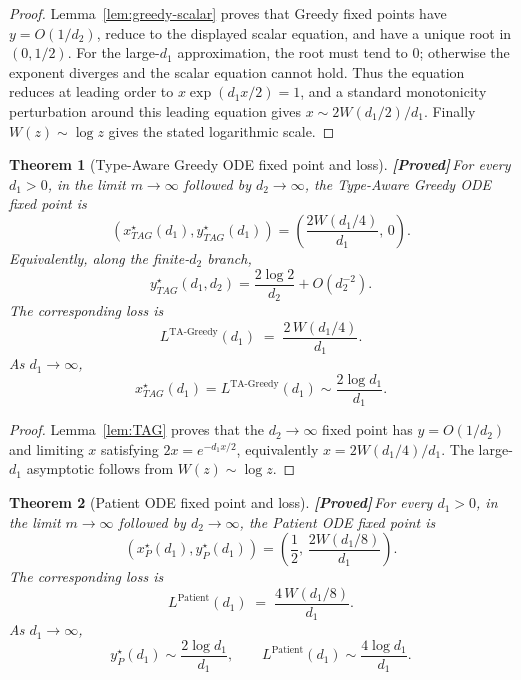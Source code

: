 \documentclass{article}
\theoremstyle{plain}
\newtheorem{theorem}{Theorem}
\theoremstyle{definition}
\newcommand{\proved}{\textcolor{provedgreen}{\textbf{[Proved]}}\,}
\begin{document}
\begin{proof}
Lemma~\ref{lem:greedy-scalar} proves that Greedy fixed points have $y=O(1/d_2)$, reduce to the displayed scalar equation, and have a unique root in $(0,1/2)$. For the large-$d_1$ approximation, the root must tend to $0$; otherwise the exponent diverges and the scalar equation cannot hold. Thus the equation reduces at leading order to $x\exp(d_1x/2)=1$, and a standard monotonicity perturbation around this leading equation gives $x\sim 2W(d_1/2)/d_1$. Finally $W(z)\sim\log z$ gives the stated logarithmic scale.
\end{proof}

\begin{theorem}[Type-Aware Greedy ODE fixed point and loss]\label{thm:tag-ode-loss}
\proved For every $d_1>0$, in the limit $m\to\infty$ followed by $d_2\to\infty$, the Type-Aware Greedy ODE fixed point is
\[
(x^\star_{TAG}(d_1),y^\star_{TAG}(d_1))
=
\left(\frac{2W(d_1/4)}{d_1},\,0\right).
\]
Equivalently, along the finite-$d_2$ branch,
\[
y^\star_{TAG}(d_1,d_2)=\frac{2\log 2}{d_2}+O(d_2^{-2}).
\]
The corresponding loss is
\begin{equation}\label{eq:LTG}
L^{\text{TA-Greedy}}(d_1) \;=\; \frac{2\,W(d_1/4)}{d_1}.
\end{equation}
As $d_1\to\infty$,
\[
x^\star_{TAG}(d_1)=L^{\text{TA-Greedy}}(d_1)
\sim \frac{2\log d_1}{d_1}.
\]
\end{theorem}

\begin{proof}
Lemma~\ref{lem:TAG} proves that the $d_2\to\infty$ fixed point has $y=O(1/d_2)$ and limiting $x$ satisfying $2x=e^{-d_1x/2}$, equivalently $x=2W(d_1/4)/d_1$. The large-$d_1$ asymptotic follows from $W(z)\sim\log z$.
\end{proof}

\begin{theorem}[Patient ODE fixed point and loss]\label{thm:patient-ode-loss}
\proved For every $d_1>0$, in the limit $m\to\infty$ followed by $d_2\to\infty$, the Patient ODE fixed point is
\[
(x^\star_P(d_1),y^\star_P(d_1))
=
\left(\frac12,\,\frac{2W(d_1/8)}{d_1}\right).
\]
The corresponding loss is
\begin{equation}\label{eq:LP}
L^{\text{Patient}}(d_1) \;=\; \frac{4\,W(d_1/8)}{d_1}.
\end{equation}
As $d_1\to\infty$,
\[
y^\star_P(d_1)\sim \frac{2\log d_1}{d_1},
\qquad
L^{\text{Patient}}(d_1)\sim \frac{4\log d_1}{d_1}.
\]
\end{theorem}
\end{document}
